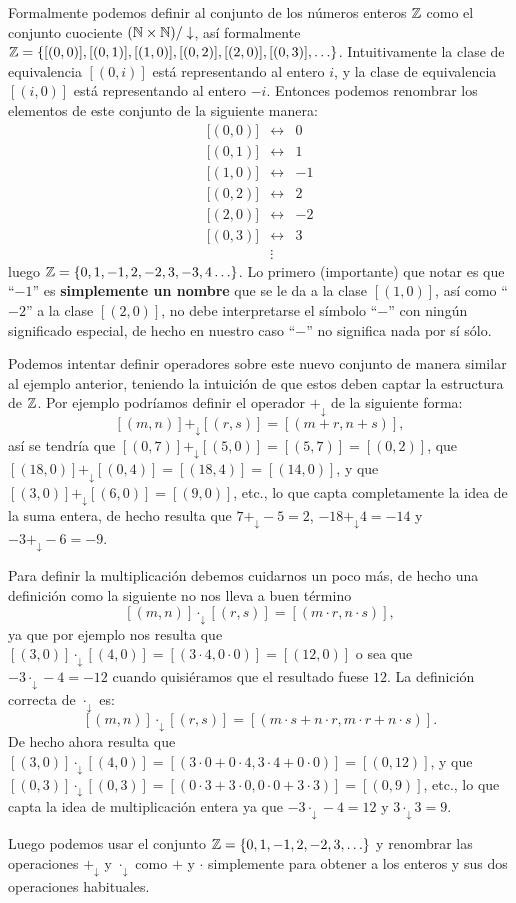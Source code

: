 \begin{ejemplo}
Formalmente podemos definir al conjunto de los números enteros $\mathbb{Z}$ como el conjunto cuociente $(\mathbb{N}\times\mathbb{N})/\downarrow$, así formalmente $\mathbb{Z}=\{[(0,0)],[(0,1)],[(1,0)],[(0,2)],[(2,0)],[(0,3)],\ldots\}$.
Intuitivamente la clase de equivalencia $[(0,i)]$ está representando al entero $i$, y la clase de equivalencia $[(i,0)]$ está representando al entero $-i$.
Entonces podemos renombrar los elementos de este conjunto de la siguiente manera:
\[
\begin{array}{ccr}
\text{[}(0,0)]&\leftrightarrow&0\\
\text{[}(0,1)]&\leftrightarrow&1\\
\text{[}(1,0)]&\leftrightarrow&-1\\
\text{[}(0,2)]&\leftrightarrow&2\\
\text{[}(2,0)]&\leftrightarrow&-2\\
\text{[}(0,3)]&\leftrightarrow&3\\
&\vdots
\end{array}
\]
luego $\mathbb{Z}=\{0,1,-1,2,-2,3,-3,4\ldots\}$.
Lo primero (importante) que notar es que ``$-1$'' es {\bf simplemente un nombre} que se le da a la clase $[(1,0)]$, así como ``$-2$'' a la clase $[(2,0)]$, no debe interpretarse el símbolo ``$-$'' con ningún significado especial, de hecho en nuestro caso ``$-$'' no significa nada por sí sólo.

Podemos intentar definir operadores sobre este nuevo conjunto de manera similar al ejemplo anterior, teniendo la intuición de que estos deben captar la estructura de $\mathbb{Z}$.
Por ejemplo podríamos definir el operador $+_\downarrow$ de la siguiente forma:
\[
[(m,n)]+_\downarrow[(r,s)]=[(m+r,n+s)],
\]
así se tendría que $[(0,7)]+_\downarrow[(5,0)]=[(5,7)]=[(0,2)]$, que $[(18,0)]+_\downarrow[(0,4)]=[(18,4)]=[(14,0)]$, y que $[(3,0)]+_\downarrow[(6,0)]=[(9,0)]$, etc.,
lo que capta completamente la idea de la suma entera, de hecho resulta que $7+_\downarrow-5=2$, $-18+_\downarrow 4=-14$ y $-3+_\downarrow-6=-9$.

Para definir la multiplicación debemos cuidarnos un poco más, de hecho una definición como la siguiente no nos lleva a buen término
\[
[(m,n)]\cdot_\downarrow[(r,s)]=[(m\cdot r,n\cdot s)],
\]
ya que por ejemplo nos resulta que $[(3,0)]\cdot_\downarrow[(4,0)]=[(3\cdot 4,0\cdot 0)]=[(12,0)]$ o sea que $-3\cdot_\downarrow-4=-12$ cuando quisiéramos que el resultado fuese $12$.
La definición correcta de $\cdot_\downarrow$ es:
\[
[(m,n)]\cdot_\downarrow[(r,s)]=[(m\cdot s+n\cdot r,m\cdot r+n\cdot s)].
\]
De hecho ahora resulta que $[(3,0)]\cdot_\downarrow[(4,0)]=[(3\cdot 0+0\cdot 4,3\cdot 4+0\cdot 0)]=[(0,12)]$, y que $[(0,3)]\cdot_\downarrow[(0,3)]=[(0\cdot 3+3\cdot 0,0\cdot 0+3\cdot 3)]=[(0,9)]$, etc., lo que capta la idea de multiplicación entera ya que $-3\cdot_\downarrow-4=12$ y $3\cdot_\downarrow 3=9$.

Luego podemos usar el conjunto $\mathbb{Z}=\{0,1,-1,2,-2,3,\ldots\}$ y renombrar las operaciones $+_\downarrow$ y $\cdot_\downarrow$ como $+$ y $\cdot$ simplemente para obtener a los enteros y sus dos operaciones habituales.
\end{ejemplo}